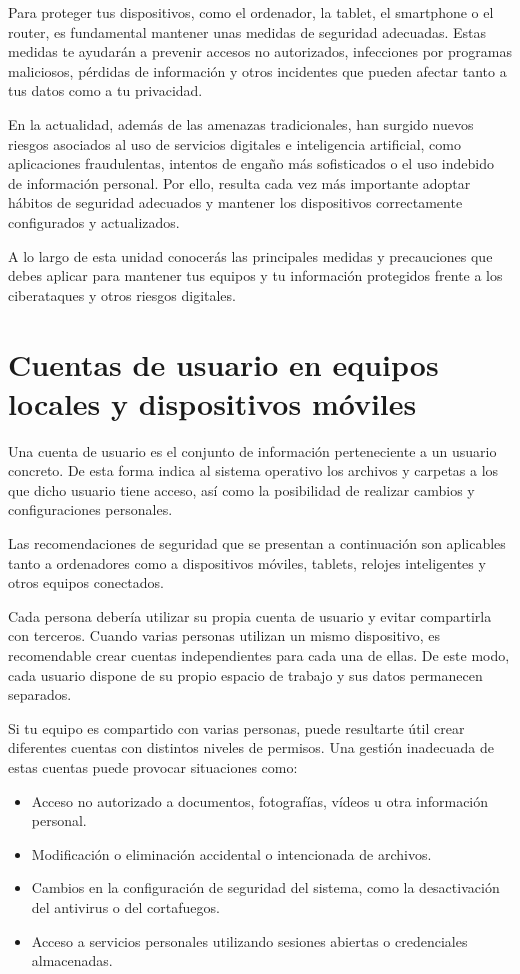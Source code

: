 \documentclass[
  spanish,
  a4paper,
  openany]{book}
\begin{document}
Para proteger tus dispositivos, como el ordenador, la tablet, el smartphone o el router, es fundamental mantener unas medidas de seguridad adecuadas. Estas medidas te ayudarán a prevenir accesos no autorizados, infecciones por programas maliciosos, pérdidas de información y otros incidentes que pueden afectar tanto a tus datos como a tu privacidad.

En la actualidad, además de las amenazas tradicionales, han surgido nuevos riesgos asociados al uso de servicios digitales e inteligencia artificial, como aplicaciones fraudulentas, intentos de engaño más sofisticados o el uso indebido de información personal. Por ello, resulta cada vez más importante adoptar hábitos de seguridad adecuados y mantener los dispositivos correctamente configurados y actualizados.

A lo largo de esta unidad conocerás las principales medidas y precauciones que debes aplicar para mantener tus equipos y tu información protegidos frente a los ciberataques y otros riesgos digitales.

\section{Cuentas de usuario en equipos locales y dispositivos móviles}\label{cuentas-de-usuario-en-equipos-locales-y-dispositivos-muxf3viles}

Una cuenta de usuario es el conjunto de información perteneciente a un usuario concreto. De esta forma indica al sistema operativo los archivos y carpetas a los que dicho usuario tiene acceso, así como la posibilidad de realizar cambios y configuraciones personales.

Las recomendaciones de seguridad que se presentan a continuación son aplicables tanto a ordenadores como a dispositivos móviles, tablets, relojes inteligentes y otros equipos conectados.

Cada persona debería utilizar su propia cuenta de usuario y evitar compartirla con terceros. Cuando varias personas utilizan un mismo dispositivo, es recomendable crear cuentas independientes para cada una de ellas. De este modo, cada usuario dispone de su propio espacio de trabajo y sus datos permanecen separados.

Si tu equipo es compartido con varias personas, puede resultarte útil crear diferentes cuentas con distintos niveles de permisos. Una gestión inadecuada de estas cuentas puede provocar situaciones como:

\begin{itemize}
\item
  Acceso no autorizado a documentos, fotografías, vídeos u otra información personal.
\item
  Modificación o eliminación accidental o intencionada de archivos.
\item
  Cambios en la configuración de seguridad del sistema, como la desactivación del antivirus o del cortafuegos.
\item
  Acceso a servicios personales utilizando sesiones abiertas o credenciales almacenadas.
\end{itemize}
\end{document}
